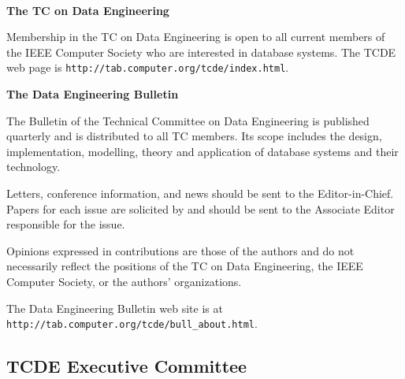 \documentclass[10pt,twocolumn]{article}
\begin{document}

\verb-  -                     	\newline
\noindent
\begin{small}
{\bf The TC on Data Engineering}

Membership in the TC on Data Engineering
is open to all current members of the IEEE Computer
Society who are interested in database systems.
The TCDE web page is 
\verb+http://tab.computer.org/tcde/index.html+.

\vspace{.1cm}
\noindent 
{\bf The Data Engineering Bulletin}

The Bulletin of the Technical Committee on
Data Engineering is published quarterly and is
distributed to all TC members.  Its
scope includes the design, implementation, 
modelling, theory and application of database 
systems and their technology.  

Letters, conference information, and news
should be sent to the Editor-in-Chief.
Papers for each issue are
solicited by and should be sent to the
Associate Editor responsible for the issue.

Opinions expressed in contributions are those
of the authors and do not necessarily reflect
the positions of the TC on Data Engineering,
the IEEE Computer Society, or the authors'
organizations.

The Data Engineering Bulletin web site is at
\newline
\verb+http://tab.computer.org/tcde/bull_about.html+.
\end{small}

\newpage

\subsection*{TCDE Executive Committee}
\end{document}

